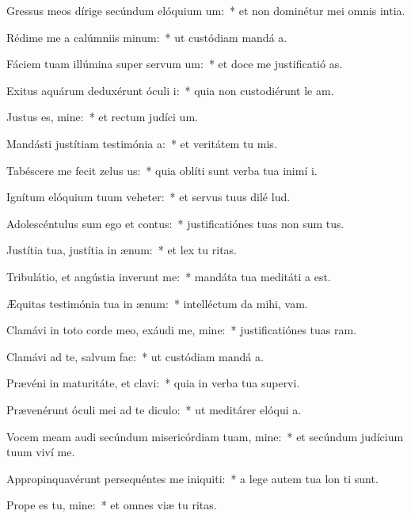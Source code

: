 \item Gressus meos dírige secúndum elóquium um:~* et non dominétur mei omnis intia.
\item Rédime me a calúmniis minum:~* ut custódiam mandá a.
\item Fáciem tuam illúmina super servum um:~* et doce me justificatió as.
\item Exitus aquárum deduxérunt óculi i:~* quia non custodiérunt le am.
\item Justus es, mine:~* et rectum judíci um.
\item Mandásti justítiam testimónia a:~* et veritátem tu mis.
\item Tabéscere me fecit zelus us:~* quia oblíti sunt verba tua inimí i.
\item Ignítum elóquium tuum veheter:~* et servus tuus dilé lud.
\item Adolescéntulus sum ego et contus:~* justificatiónes tuas non sum tus.
\item Justítia tua, justítia in ænum:~* et lex tu ritas.
\item Tribulátio, et angústia inverunt me:~* mandáta tua meditáti a est.
\item Æquitas testimónia tua in ænum:~* intelléctum da mihi,  vam.
\item Clamávi in toto corde meo, exáudi me, mine:~* justificatiónes tuas ram.
\item Clamávi ad te, salvum  fac:~* ut custódiam mandá a.
\item Prævéni in maturitáte, et clavi:~* quia in verba tua supervi.
\item Prævenérunt óculi mei ad te diculo:~* ut meditárer elóqui a.
\item Vocem meam audi secúndum misericórdiam tuam, mine:~* et secúndum judícium tuum viví me.
\item Appropinquavérunt persequéntes me iniquiti:~* a lege autem tua lon ti sunt.
\item Prope es tu, mine:~* et omnes viæ tu ritas.
